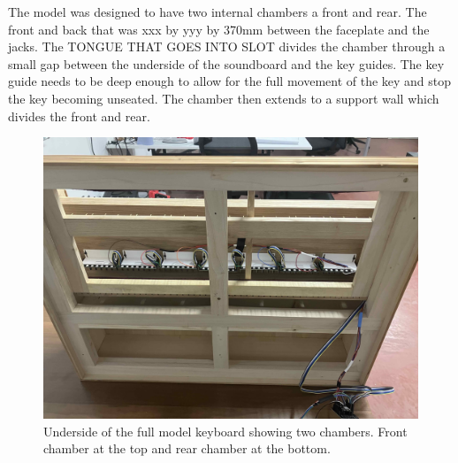 
The model was designed to have two internal chambers a front and rear.
The front and back that was xxx by yyy by 370mm between the faceplate
and the jacks. The TONGUE THAT GOES INTO SLOT divides the chamber through
a small gap between the underside of the soundboard and the key guides.
The key guide needs to be deep enough to allow for the full movement of
the key and stop the key becoming unseated. The chamber then extends to
a support wall which divides the front and rear.



\begin{figure}  
  \centering
  \includegraphics[width=\linewidth]{src/images/49-key-bottom-sensors-no-keys.jpg} 
  \caption{Underside of the full model keyboard showing two chambers. Front chamber at the top and rear chamber at the bottom.} 
  \Description{} 
  \label{fig:49-key-bottom}
\end{figure}


